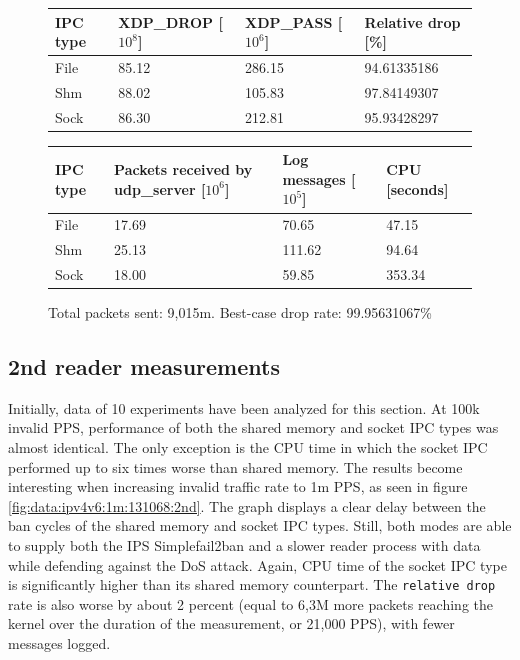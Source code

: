 \begin{figure}[!h]
	\centering
	\scriptsize
	\begin{tabular}{llll}
		\toprule
		\textbf{IPC type} & \textbf{XDP\_DROP [$10^8$]} & \textbf{XDP\_PASS [$10^6$]} & \textbf{Relative drop [\%]} \\ \midrule 
		File & 85.12 & 286.15 & 94.61335186 \\
        Shm & 88.02 & 105.83 & 97.84149307 \\
        Sock & 86.30 & 212.81 & 95.93428297 \\
	\bottomrule
	\end{tabular}
    \begin{tabular}{llll}
		\toprule
		\textbf{IPC type} & \textbf{Packets received by udp\_server [$10^6$]} & \textbf{Log messages [$10^5$]} & \textbf{CPU [seconds]} \\ \midrule 
		File & 17.69 & 70.65 & 47.15 \\
        Shm & 25.13 & 111.62 & 94.64 \\
        Sock & 18.00 & 59.85 & 353.34 \\
	\bottomrule
	\end{tabular}
	\caption[Simplefail2ban, IPv4v6, 30m \ac{PPS}, 131,068 malicious clients]{Total packets sent: 9,015m. Best-case drop rate: 99.95631067\%}
	\label{fig:data:ipv4v6:30m:131068}
\end{figure}

\subsection{2nd reader measurements}
Initially, data of 10 experiments have been analyzed for this section.
At 100k invalid \ac{PPS}, performance of both the shared memory and socket \ac{IPC} types was almost identical.
The only exception is the \ac{CPU} time in which the socket \ac{IPC} performed up to six times worse than shared memory.
The results become interesting when increasing invalid traffic rate to 1m \ac{PPS}, as seen in figure \ref{fig:data:ipv4v6:1m:131068:2nd}.
The graph displays a clear delay between the ban cycles of the shared memory and socket \ac{IPC} types.
Still, both modes are able to supply both the \ac{IPS} Simplefail2ban and a slower reader process with data while defending against the \ac{DoS} attack.
Again, \ac{CPU} time of the socket \ac{IPC} type is significantly higher than its shared memory counterpart.
The \texttt{relative drop} rate is also worse by about 2 percent (equal to 6,3M more packets reaching the kernel over the duration of the measurement, or 21,000 \ac{PPS}), with fewer messages logged.

